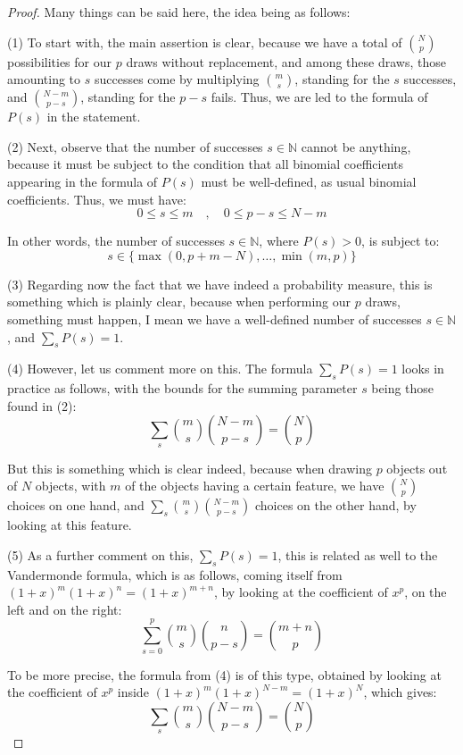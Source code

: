 \documentclass[12pt]{amsbook}
\begin{document}
\begin{proof}
Many things can be said here, the idea being as follows:

\medskip

(1) To start with, the main assertion is clear, because we have a total of $\binom{N}{p}$ possibilities for our $p$ draws without replacement, and among these draws, those amounting to $s$ successes come by multiplying $\binom{m}{s}$, standing for the $s$ successes, and $\binom{N-m}{p-s}$, standing for the $p-s$ fails. Thus, we are led to the formula of $P(s)$ in the statement.

\medskip

(2) Next, observe that the number of successes $s\in\mathbb N$ cannot be anything, because it must be subject to the condition that all binomial coefficients appearing in the formula of $P(s)$ must be well-defined, as usual binomial coefficients. Thus, we must have:
$$0\leq s\leq m\quad,\quad 0\leq p-s\leq N-m$$

In other words, the number of successes $s\in\mathbb N$, where $P(s)>0$, is subject to:
$$s\in\{\max(0,p+m-N),\ldots,\min(m,p)\}$$

(3) Regarding now the fact that we have indeed a probability measure, this is something which is plainly clear, because when performing our $p$ draws, something must happen, I mean we have a well-defined number of successes $s\in\mathbb N$, and $\sum_sP(s)=1$.

\medskip

(4) However, let us comment more on this. The formula $\sum_sP(s)=1$ looks in practice as follows, with the bounds for the summing parameter $s$ being those found in (2):
$$\sum_s\binom{m}{s}\binom{N-m}{p-s}=\binom{N}{p}$$

But this is something which is clear indeed, because when drawing $p$ objects out of $N$ objects, with $m$ of the objects having a certain feature, we have $\binom{N}{p}$ choices on one hand, and $\sum_s\binom{m}{s}\binom{N-m}{p-s}$ choices on the other hand, by looking at this feature.

\medskip

(5) As a further comment on this, $\sum_sP(s)=1$, this is related as well to the Vandermonde formula, which is as follows, coming itself from $(1+x)^m(1+x)^n=(1+x)^{m+n}$, by looking at the coefficient of $x^p$, on the left and on the right:
$$\sum_{s=0}^p\binom{m}{s}\binom{n}{p-s}=\binom{m+n}{p}$$

To be more precise, the formula from (4) is of this type, obtained by looking at the coefficient of $x^p$ inside $(1+x)^m(1+x)^{N-m}=(1+x)^N$, which gives:
$$\sum_s\binom{m}{s}\binom{N-m}{p-s}=\binom{N}{p}$$


\end{proof}
\end{document}
